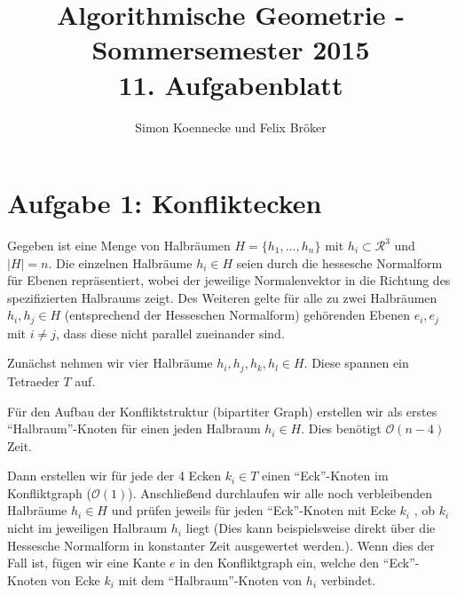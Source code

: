 \documentclass[a4paper]{article}
\begin{document}
\title{Algorithmische Geometrie - Sommersemester 2015\\
       11. Aufgabenblatt }
\author{Simon Koennecke und Felix Bröker}
\date{}
\maketitle

\section*{Aufgabe 1: Konfliktecken}


Gegeben ist eine Menge von Halbräumen $H = \{h_1, \dots, h_n\}$ mit $h_i \subset \mathcal{R}^3$ und $|H| = n$.
Die einzelnen Halbräume $h_i \in H$ seien durch die hessesche Normalform für Ebenen 
repräsentiert, wobei der jeweilige Normalenvektor in die Richtung des spezifizierten
Halbraums zeigt. Des Weiteren gelte für alle zu zwei Halbräumen
$h_i, h_j \in H$ (entsprechend der Hesseschen Normalform) gehörenden Ebenen $e_i, e_j$ mit $i \neq j$, dass diese nicht parallel zueinander sind.


\begin{figure}[!htb]
\centering
{} 
\end{figure} 



Zunächst nehmen wir vier Halbräume $h_i, h_j, h_k, h_l \in H$. 
Diese spannen ein Tetraeder $T$ auf. 

Für den Aufbau der Konfliktstruktur (bipartiter Graph) erstellen wir als erstes 
"`Halbraum"'-Knoten für einen jeden Halbraum $h_i \in H$. Dies benötigt $\mathcal{O}(n-4)$
Zeit.

Dann erstellen wir für jede der 4 Ecken $k_i \in T$ einen "`Eck"'-Knoten im Konfliktgraph
($\mathcal{O}(1)$).
Anschließend durchlaufen wir alle noch verbleibenden Halbräume $h_i \in H$ 
und prüfen jeweils für jeden "`Eck"'-Knoten mit Ecke $k_i$ , ob $k_i$ nicht im 
jeweiligen Halbraum $h_i$ liegt (Dies kann beispielsweise direkt über die Hessesche Normalform
in konstanter Zeit ausgewertet werden.). Wenn dies der Fall ist, fügen wir eine Kante $e$ in 
den Konfliktgraph ein, welche den "`Eck"'-Knoten von Ecke $k_i$ mit dem "`Halbraum"'-Knoten
von $h_i$ verbindet. 
\end{document}
